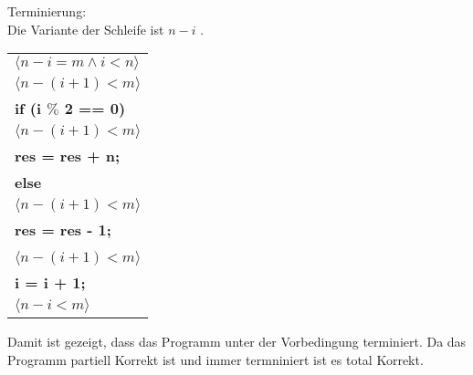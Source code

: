 \documentclass[12pt]{article}
\begin{document}
\begin{center}
    Terminierung:\\
    Die Variante der Schleife ist $n - i$ .
    \bigbreak
    \begin{tabular}{l}
        $\langle n-i=m \wedge i < n \rangle$\\
        $\langle n-(i+1)<m \rangle$\\
        \quad \textbf{if (i $\%$ 2 == 0)} \pmb{\{} \\
        \quad \quad $\langle n-(i+1)<m \rangle$\\
        \quad \quad \quad \textbf{res = res + n;}\\
        \quad \pmb{\}} \textbf{else} \pmb{\{} \\
        \quad \quad $\langle n-(i+1)<m \rangle$\\
        \quad \quad \quad \textbf{res = res - 1;}\\
        \quad \pmb{\}}\\
        $\langle n-(i+1)<m \rangle$\\
        \quad \textbf{i = i + 1;}\\
        $\langle n-i<m \rangle$
    \end{tabular}
    \bigbreak
    Damit ist gezeigt, dass das Programm unter der Vorbedingung terminiert.
    \bigbreak
    Da das Programm partiell Korrekt ist und immer termniniert ist es total Korrekt.
\end{center}
\end{document}
